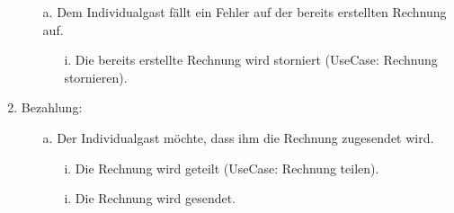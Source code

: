 \documentclass[./detailed_overview_usecases.tex]{subfiles}
\begin{document}
\begin{enumerate}
        \begin{itemize}
            \item[a.] Dem Individualgast fällt ein Fehler auf der bereits erstellten Rechnung auf.
            \begin{itemize}
                \item[i.] Die bereits erstellte Rechnung wird storniert (UseCase: Rechnung stornieren).
            \end{itemize}
        \end{itemize}
        \setcounter{enumi}{5}
        \item Bezahlung: \begin{itemize}
                             \item[a.] Der Individualgast möchte, dass ihm die Rechnung zugesendet wird.
                             \begin{itemize}
                                 \item[i.] Die Rechnung wird geteilt (UseCase: Rechnung teilen).
                                 \item[i.] Die Rechnung wird gesendet.
                             \end{itemize}
        \end{itemize}
    \end{enumerate}
\end{document}
